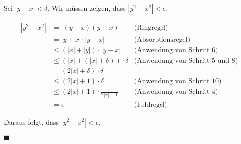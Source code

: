 Sei $|y - x| < \delta$. Wir müssen zeigen, dass $|y^2 - x^2| < \epsilon$.

\begin{align*}
|y^2 - x^2| &= |(y + x)(y - x)| & \text{(Ringregel)} \\
            &= |y + x| \cdot |y - x| & \text{(Absorptionsregel)} \\
            &\leq (|x| + |y|) \cdot |y - x| & \text{(Anwendung von Schritt 6)} \\
            &\leq (|x| + (|x| + \delta)) \cdot \delta & \text{(Anwendung von Schritt 5 und 8)} \\
            &= (2|x| + \delta) \cdot \delta \\
            &\leq (2|x| + 1) \cdot \delta & \text{(Anwendung von Schritt 10)} \\
            &\leq (2|x| + 1) \cdot \frac{\epsilon}{2|x| + 1} & \text{(Anwendung von Schritt 4)} \\
            &= \epsilon & \text{(Feldregel)}
\end{align*}

Daraus folgt, dass $|y^2 - x^2| < \epsilon$.

\hfill $\blacksquare$
